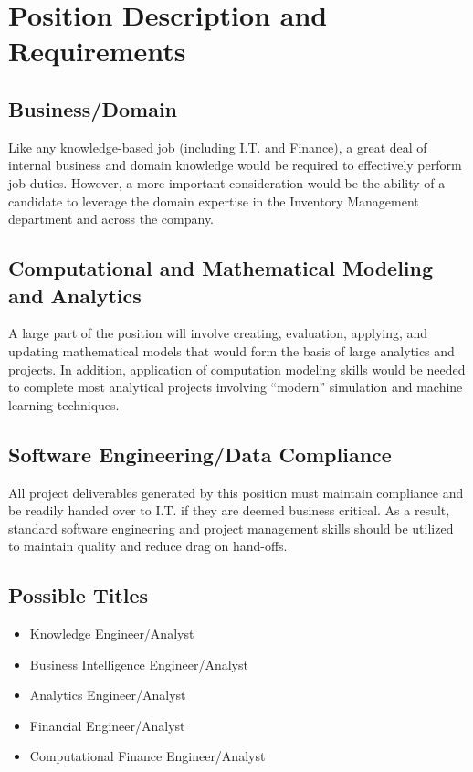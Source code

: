 \documentclass[10pt,journal,compsoc]{IEEEtran}
\begin{document}
\section{Position Description and Requirements}

    \subsection{Business/Domain}

    Like any knowledge-based job (including I.T. and Finance), a great deal
    of internal business and domain knowledge would be required to effectively
    perform job duties.  However, a more important consideration would be the
    ability of a candidate to leverage the domain expertise in the
    Inventory Management department and across the company.

    \subsection{Computational and Mathematical Modeling and Analytics}

    A large part of the position will involve creating, evaluation, applying,
    and updating mathematical models that would form the basis of large
    analytics and projects.  In addition, application of computation modeling
    skills would be needed to complete most analytical projects involving
    ``modern'' simulation and machine learning techniques.

    \subsection{Software Engineering/Data Compliance}

    All project deliverables generated by this position must maintain
    compliance and be readily handed over to I.T. if they are deemed business
    critical. As a result, standard software engineering and project management
    skills should be utilized to maintain quality and reduce drag on hand-offs.

    \subsection{Possible Titles}

    \begin{itemize}
        \item Knowledge Engineer/Analyst
        \item Business Intelligence Engineer/Analyst
        \item Analytics Engineer/Analyst
        \item Financial Engineer/Analyst
        \item Computational Finance Engineer/Analyst
    \end{itemize}
\end{document}
